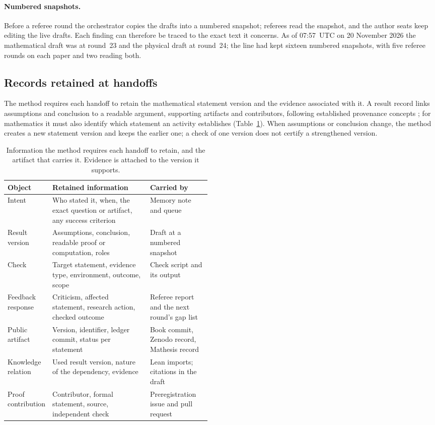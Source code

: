 \documentclass[11pt]{article}
\begin{document}
\paragraph{Numbered snapshots.} Before a referee round the orchestrator copies
the drafts into a numbered snapshot; referees read the snapshot, and the
author seats keep editing the live drafts. Each finding can therefore be
traced to the exact text it concerns. As of 07:57~UTC on 20 November 2026 the
mathematical draft was at round~23 and the physical draft at round~24; the
line had kept sixteen numbered snapshots, with five referee rounds on each
paper and two reading both.

\subsection{Records retained at handoffs}
\label{sec:records}
The method requires each handoff to retain the mathematical statement version
and the evidence associated with it. A result record links assumptions and
conclusion to a readable argument, supporting artifacts and contributors,
following established provenance concepts \citep{prov}; for mathematics it
must also identify which statement an activity establishes
(Table~\ref{tab:records}). When assumptions or conclusion change, the method
creates a new statement version and keeps the earlier one; a check of one
version does not certify a strengthened version.

\begin{table}[htbp]
\centering\small
\caption{Information the method requires each handoff to retain, and the
artifact that carries it. Evidence is attached to the version it supports.}
\label{tab:records}
\begin{tabularx}{\linewidth}{@{}>{\raggedright\arraybackslash}p{0.17\linewidth}>{\raggedright\arraybackslash}X>{\raggedright\arraybackslash}p{0.3\linewidth}@{}}
\toprule
Object & Retained information & Carried by \\
\midrule
Intent & Who stated it, when, the exact question or artifact, any success criterion & Memory note and queue \\
Result version & Assumptions, conclusion, readable proof or computation, roles & Draft at a numbered snapshot \\
Check & Target statement, evidence type, environment, outcome, scope & Check script and its output \\
Feedback response & Criticism, affected statement, research action, checked outcome & Referee report and the next round's gap list \\
Public artifact & Version, identifier, ledger commit, status per statement & Book commit, Zenodo record, Mathesis record \\
Knowledge relation & Used result version, nature of the dependency, evidence & Lean imports; citations in the draft \\
Proof contribution & Contributor, formal statement, source, independent check & Preregistration issue and pull request \\
\bottomrule
\end{tabularx}
\end{table}
\end{document}
